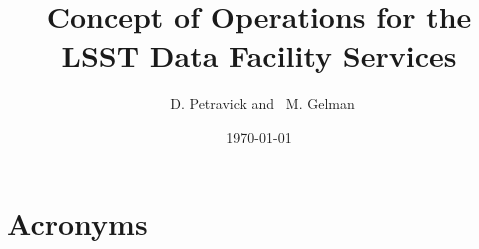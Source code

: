 \documentclass[DM,lsstdraft,toc]{lsstdoc}
\title[ConOps for LSST Data Facility Services]{Concept of Operations for the LSST Data Facility Services}
\author{
~D. Petravick and
~M. Gelman}
\date{\today}
\begin{document}
\maketitle




\section{Acronyms}

\end{document}
